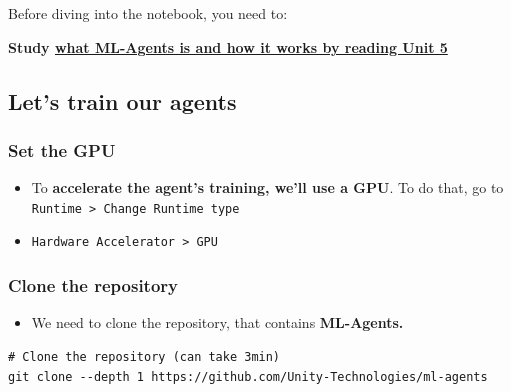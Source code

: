 \documentclass[11pt,a4paper]{article}
\begin{document}
Before diving into the notebook, you need to:

\textbf{Study \href{https://huggingface.co/deep-rl-course/unit5/introduction}{what ML-Agents is and how it works by reading Unit 5}}

\subsection{Let's train our agents}\label{lets-train-our-agents}

\subsubsection{Set the GPU}\label{set-the-gpu}

\begin{itemize}
\tightlist
\item
  To \textbf{accelerate the agent's training, we'll use a GPU}. To do that, go to \texttt{Runtime\ \textgreater{}\ Change\ Runtime\ type}
\end{itemize}


\begin{itemize}
\tightlist
\item
  \texttt{Hardware\ Accelerator\ \textgreater{}\ GPU}
\end{itemize}


\subsubsection{Clone the repository}\label{clone-the-repository}

\begin{itemize}
\tightlist
\item
  We need to clone the repository, that contains \textbf{ML-Agents.}
\end{itemize}

\begin{lstlisting}
# Clone the repository (can take 3min)
git clone --depth 1 https://github.com/Unity-Technologies/ml-agents
\end{lstlisting}
\end{document}

